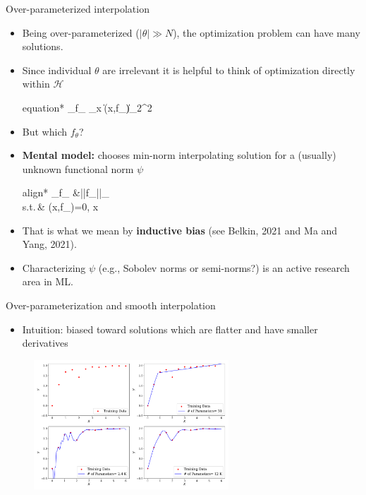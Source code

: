 \documentclass[aspectratio=169,10pt]{beamer}
\newcommand{\emphcolor}[1]{\textbf{\textcolor{emphcolorval}{#1}}}
\newcommand{\st}{\textrm{s.t.}\,}
\begin{document}
\begin{frame}{Over-parameterized interpolation}
	\begin{itemize}
		\item Being over-parameterized ($|\theta|\gg N$), the optimization problem can have many solutions.
		\item Since individual $\theta$ are irrelevant it is helpful to think of optimization directly within $\mathcal{H}$
		\vspace{-0.025in}
		\begin{empheq}[box=\tcbhighmath]{equation*}
			\min_{f_{\theta} \in {}} \sum_{x \in {}} \|\ell(x,f_{\theta})\|_2^2\label{eq:functional-optimization}
		\end{empheq}
		\vspace{-0.025in}
	\item But which $f_{\theta}$?
	\item \emphcolor{Mental model:} chooses min-norm interpolating solution for a (usually) unknown functional norm $\psi$
			\vspace{-0.025in}
	\begin{empheq}[box=\tcbhighmath]{align*}
		\min_{f_\theta\in {}} &||f_\theta||_\psi\\
		\st & \ell(x,f_\theta)=0,\quad {} x \in {}
	\end{empheq}
	\vspace{-0.025in}
	\item That is what we mean by \emphcolor{inductive bias} (see Belkin, 2021 and Ma and Yang, 2021).
	
	\item  Characterizing $\psi$ (e.g., Sobolev norms or semi-norms?) is an active research area in ML.
	\end{itemize}
\end{frame}

\begin{frame}{Over-parameterization and smooth interpolation}
	\begin{itemize}
		\item Intuition: biased toward solutions which are flatter and have smaller derivatives
	\end{itemize}
		\begin{figure}[t!]
		\centering
		\includegraphics[width=0.65\textwidth]{figs/smooth_interpolation.pdf}
	\end{figure}
\end{frame}
\end{document}
